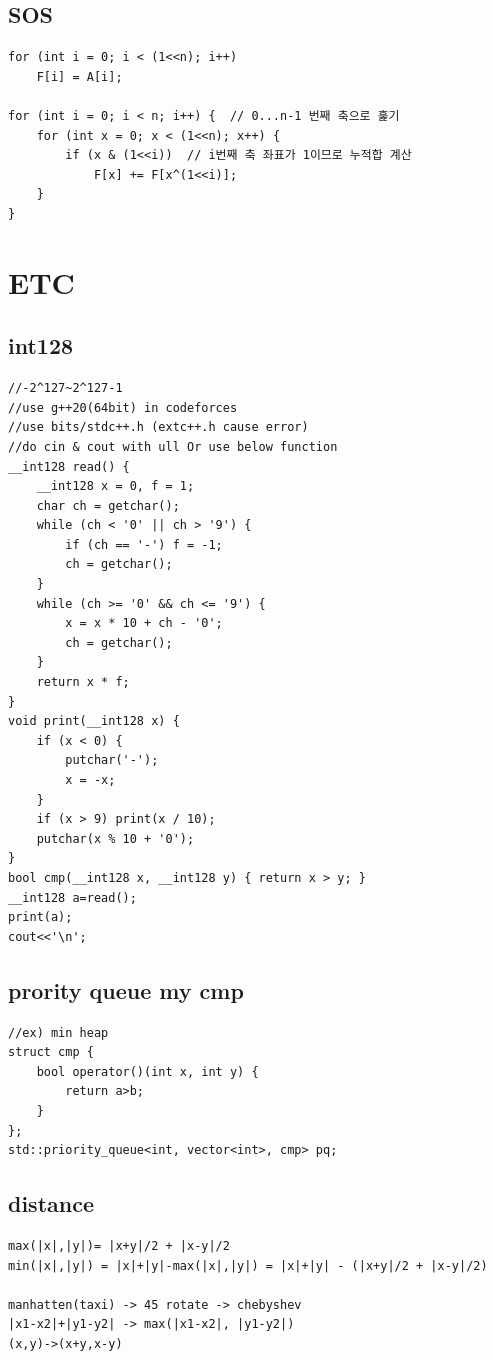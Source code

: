\documentclass[landscape, 8pt, a4paper, oneside, twocolumn]{extarticle}
\begin{document}
\subsection{SOS}
\begin{verbatim}
for (int i = 0; i < (1<<n); i++)
    F[i] = A[i];

for (int i = 0; i < n; i++) {  // 0...n-1 번째 축으로 훑기
    for (int x = 0; x < (1<<n); x++) {
        if (x & (1<<i))  // i번째 축 좌표가 1이므로 누적합 계산
            F[x] += F[x^(1<<i)];
    }
}
\end{verbatim}
\newpage
\section{ETC}
\subsection{int128}
\begin{verbatim}
//-2^127~2^127-1
//use g++20(64bit) in codeforces
//use bits/stdc++.h (extc++.h cause error)
//do cin & cout with ull Or use below function
__int128 read() {
    __int128 x = 0, f = 1;
    char ch = getchar();
    while (ch < '0' || ch > '9') {
        if (ch == '-') f = -1;
        ch = getchar();
    }
    while (ch >= '0' && ch <= '9') {
        x = x * 10 + ch - '0';
        ch = getchar();
    }
    return x * f;
}
void print(__int128 x) {
    if (x < 0) {
        putchar('-');
        x = -x;
    }
    if (x > 9) print(x / 10);
    putchar(x % 10 + '0');
}
bool cmp(__int128 x, __int128 y) { return x > y; }
__int128 a=read();
print(a);
cout<<'\n';
\end{verbatim}
\subsection{prority queue my cmp}
\begin{verbatim}
//ex) min heap
struct cmp {
    bool operator()(int x, int y) {
        return a>b;
    }
};
std::priority_queue<int, vector<int>, cmp> pq;
\end{verbatim}
\vspace{5mm}
\subsection{distance}
\begin{verbatim}
max(|x|,|y|)= |x+y|/2 + |x-y|/2
min(|x|,|y|) = |x|+|y|-max(|x|,|y|) = |x|+|y| - (|x+y|/2 + |x-y|/2)

manhatten(taxi) -> 45 rotate -> chebyshev
|x1-x2|+|y1-y2| -> max(|x1-x2|, |y1-y2|)
(x,y)->(x+y,x-y)
\end{verbatim}
\vspace{5mm}
\end{document}
